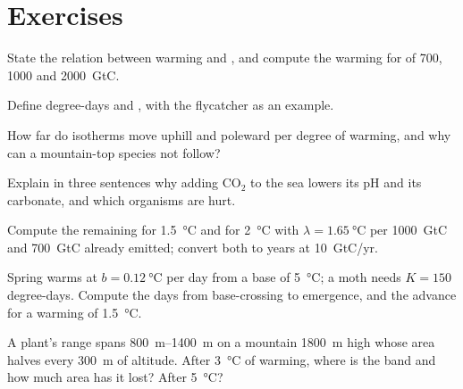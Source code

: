 \section{Exercises}

\begin{exercise}[$\star$]\label{exo:b2:global-change:1}
State the relation between warming and , and
compute the warming for  of 700, 1000 and
\qty{2000}{GtC}.
\end{exercise}

\begin{exercise}[$\star$]\label{exo:b2:global-change:2}
Define degree-days and , with the flycatcher
as an example.
\end{exercise}

\begin{exercise}[$\star$]\label{exo:b2:global-change:3}
How far do isotherms move uphill and poleward per degree of
warming, and why can a mountain-top species not follow?
\end{exercise}

\begin{exercise}[$\star$]\label{exo:b2:global-change:4}
Explain in three sentences why adding \ensuremath{\mathrm{CO_2}} to the sea lowers
its pH and its carbonate, and which organisms are hurt.
\end{exercise}

\begin{exercise}[$\star\star$]\label{exo:b2:global-change:5}
Compute the  remaining for \qty{1.5}{\celsius} and for
\qty{2}{\celsius} with $\lambda = \qty{1.65}{\celsius}$ per
\qty{1000}{GtC} and \qty{700}{GtC} already emitted; convert both to
years at \qty{10}{GtC/yr}.
\end{exercise}

\begin{exercise}[$\star\star$]\label{exo:b2:global-change:6}
Spring warms at $b = \qty{0.12}{\celsius}$ per day from a base of
\qty{5}{\celsius}; a moth needs $K = 150$ degree-days. Compute the
days from base-crossing to emergence, and the advance for a
warming of \qty{1.5}{\celsius}.
\end{exercise}

\begin{exercise}[$\star\star$]\label{exo:b2:global-change:7}
A plant's range spans \qtyrange{800}{1400}{m} on a mountain
\qty{1800}{m} high whose area halves every \qty{300}{m} of altitude.
After \qty{3}{\celsius} of warming, where is the band and how much
area has it lost? After \qty{5}{\celsius}?
\end{exercise}

